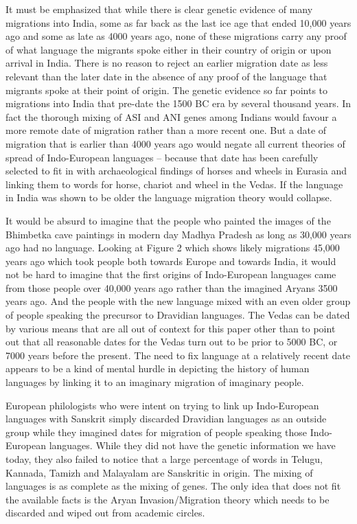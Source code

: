 It must be emphasized that while there is clear genetic evidence of many migrations into India, some as far back as the last ice age that ended 10,000 years ago and some as late as 4000 years ago, none of these migrations carry any proof of what language the migrants spoke either in their country of origin or upon arrival in India. There is no reason to reject an earlier migration date as less relevant than the later date in the absence of any proof of the language that migrants spoke at their point of origin. The genetic evidence so far points to migrations into India that pre-date the 1500 BC era by several thousand years. In fact the thorough mixing of ASI and ANI genes among Indians would favour a more remote date of migration rather than a more recent one. But a date of migration that is earlier than 4000 years ago would negate all current theories of spread of Indo-European languages – because that date has been carefully selected to fit in with archaeological findings of horses and wheels in Eurasia and linking them to words for horse, chariot and wheel in the Vedas. If the language in India was shown to be older the language migration theory would collapse.

It would be absurd to imagine that the people who painted the images of the Bhimbetka cave paintings in modern day Madhya Pradesh as long as 30,000 years ago had no language. Looking at Figure 2 which shows likely migrations 45,000 years ago which took people both towards Europe and towards India, it would not be hard to imagine that the first origins of Indo-European languages came from those people over 40,000 years ago rather than the imagined Aryans 3500 years ago. And the people with the new language mixed with an even older group of people speaking the precursor to Dravidian languages. The Vedas can be dated by various means that are all out of context for this paper other than to point out that all reasonable dates for the Vedas turn out to be prior to 5000 BC, or 7000 years before the present. The need to fix language at a relatively recent date appears to be a kind of mental hurdle in depicting the history of human languages by linking it to an imaginary migration of imaginary people.

European philologists who were intent on trying to link up Indo-European languages with Sanskrit simply discarded Dravidian languages as an outside group while they imagined dates for migration of people speaking those Indo-European languages. While they did not have the genetic information we have today, they also failed to notice that a large percentage of words in Telugu, Kannada, Tamizh and Malayalam are Sanskritic in origin. The mixing of languages is as complete as the mixing of genes. The only idea that does not fit the available facts is the Aryan Invasion/Migration theory which needs to be discarded and wiped out from academic circles.


